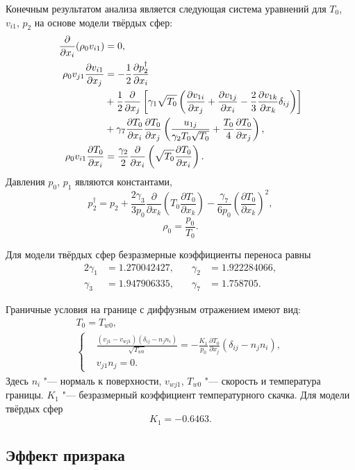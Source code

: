 \documentclass[english,russian,a4paper,12pt]{article}
\newcommand{\pder}[2][]{\frac{\partial#1}{\partial#2}}
\begin{document}
Конечным результатом анализа является следующая система уравнений для \(T_0\), \(v_{i1}\), \(p_2\)
на основе модели твёрдых сфер:
\begin{align}
	\pder{x_i}(\rho_0v_{i1}) &= 0, \label{eq:asymptotic1} \\
	\rho_0v_{j1}\pder[v_{i1}]{x_j} &= -\frac12\pder[p_2^\dag]{x_i} \notag\\
		&+ \frac12\pder{x_j}\left[\gamma_1\sqrt{T_0}\left(
			\pder[v_{1i}]{x_j}+\pder[v_{1j}]{x_i}-\frac23\pder[v_{1k}]{x_k}\delta_{ij}\right
		)\right] \notag\\
		&+ \gamma_7\pder[T_0]{x_i}\pder[T_0]{x_j}\left(
			\frac{u_{1j}}{\gamma_2T_0\sqrt{T_0}} + \frac{T_0}4\pder[T_0]{x_j}
		\right), \label{eq:asymptotic2} \\
	\rho_0v_{i1}\pder[T_0]{x_i} &= \frac{\gamma_2}2\pder{x_i}\left(
		\sqrt{T_0}\pder[T_0]{x_i}
	\right). \label{eq:asymptotic3}
\end{align}
Давления \(p_0\), \(p_1\) являются константами,
\[ 
	p_2^\dag = p_2 + 
		\frac{2\gamma_3}{3p_0}\pder{x_k}\left(T_0\pder[T_0]{x_k}\right) -
		\frac{\gamma_7}{6p_0}\left(\pder[T_0]{x_k}\right)^2,
\]
\[ \rho_0 = \frac{p_0}{T_0}. \]

Для модели твёрдых сфер безразмерные коэффициенты переноса равны
\begin{alignat*}{2}
	\gamma_1 &= 1.270042427, &\quad \gamma_2 &= 1.922284066, \\
	\gamma_3 &= 1.947906335, &\quad \gamma_7 &= 1.758705.
\end{alignat*}

Граничные условия на границе с диффузным отражением имеют вид:
\begin{gather}
	T_0 = T_{w0}, \\
	\left\{
	\begin{aligned}
		& \frac{(v_{j1}-v_{wj1})(\delta_{ij}-n_jn_i)}{\sqrt{T_{w0}}} = 
			-\frac{K_1}{p_0}\pder[T_0]{x_j}(\delta_{ij}-n_jn_i), \\
		& v_{j1}n_j = 0.
	\end{aligned}
	\right.
\end{gather}
Здесь \(n_i\) "--- нормаль к поверхности, \(v_{wj1}\), \(T_{w0}\) "--- скорость и температура границы.
\(K_1\) "--- безразмерный коэффициент температурного скачка. Для модели твёрдых сфер 
\[ K_1 = -0.6463. \]

\subsection{Эффект призрака}
\end{document}

